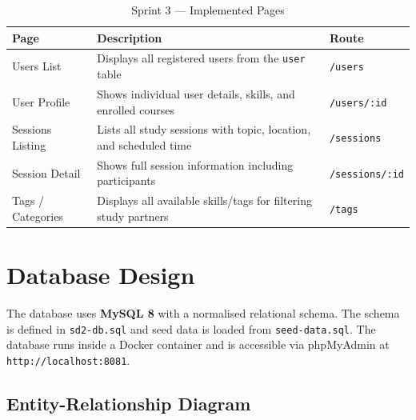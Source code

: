 \documentclass[11pt,a4paper]{article}
\begin{document}
\begin{table}[H]
\centering
\begin{tabularx}{\textwidth}{lXl}
    \toprule
    \textbf{Page} & \textbf{Description} & \textbf{Route} \\
    \midrule
    Users List          & Displays all registered users from the \texttt{user} table              & \texttt{/users} \\
    User Profile        & Shows individual user details, skills, and enrolled courses             & \texttt{/users/:id} \\
    Sessions Listing    & Lists all study sessions with topic, location, and scheduled time       & \texttt{/sessions} \\
    Session Detail      & Shows full session information including participants                    & \texttt{/sessions/:id} \\
    Tags / Categories   & Displays all available skills/tags for filtering study partners          & \texttt{/tags} \\
    \bottomrule
\end{tabularx}
\caption{Sprint 3 — Implemented Pages}
\end{table}

\newpage

\section{Database Design}

The database uses \textbf{MySQL 8} with a normalised relational schema. The schema is defined in \texttt{sd2-db.sql} and seed data is loaded from \texttt{seed-data.sql}. The database runs inside a Docker container and is accessible via phpMyAdmin at \texttt{http://localhost:8081}.

\subsection{Entity-Relationship Diagram}

\end{document}

